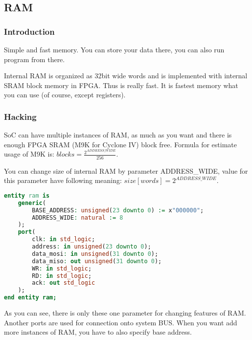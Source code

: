\subsection{RAM}

\subsubsection{Introduction}

Simple and fast memory. You can store your data there, you can also run program
from there.

Internal RAM is organized as 32bit wide words and is implemented with internal
SRAM block memory in FPGA. Thus is really fast. It is fastest memory what you
can use (of course, except registers).

\subsubsection{Hacking}

SoC can have multiple instances of RAM, as much as you want and there is
enough FPGA SRAM (M9K for Cyclone IV) block free. Formula for estimate usage
of M9K is: $ blocks = \frac{2^{ADDRESS\_WIDE}}{256} $.

You can change size of internal RAM by parameter ADDRESS\_WIDE, value for this
parameter have following meaning: $ size [words] = 2^{ADDRESS\_WIDE}$.

\begin{lstlisting}[language=VHDL, frame=single]
entity ram is
    generic(
        BASE_ADDRESS: unsigned(23 downto 0) := x"000000";
        ADDRESS_WIDE: natural := 8
    );
    port(
        clk: in std_logic;
        address: in unsigned(23 downto 0);
        data_mosi: in unsigned(31 downto 0);
        data_miso: out unsigned(31 downto 0);
        WR: in std_logic;
        RD: in std_logic;
        ack: out std_logic
    );
end entity ram;
\end{lstlisting}

As you can see, there is only these one parameter for changing features of RAM.
Another ports are used for connection onto system BUS. When you want add more
instances of RAM, you have to also specify base address.
